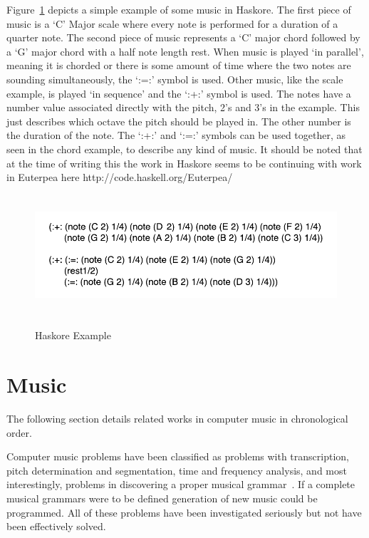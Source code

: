 \documentclass[12pt]{ucthesis}
\newcommand{\captionfonts}{\small\bf\ssp}
\begin{document}
Figure~\ref{fig:haskore-example} depicts a simple example of some music in Haskore. The first piece of music is a `C' Major scale where every note is performed for a duration of a quarter note. The second piece of music represents a `C' major chord followed by a `G' major chord with a half note length rest. When music is played `in parallel', meaning it is chorded or there is some amount of time where the two notes are sounding simultaneously, the `:=:' symbol is used. Other music, like the scale example, is played `in sequence' and the `:+:' symbol is used. The notes have a number value associated directly with the pitch, 2's and 3's in the example. This just describes which octave the pitch should be played in. The other number is the duration of the note. The `:+:' and `:=:' symbols can be used together, as seen in the chord example, to describe any kind of music. It should be noted that at the time of writing this the work in Haskore seems to be continuing with work in Euterpea here http://code.haskell.org/Euterpea/

\begin{figure}
\includegraphics[height=45mm]{haskore-example.pdf}
\captionfonts
\caption[Haskore Example]{Haskore Example}
\label{fig:haskore-example}
\end{figure}


\section{Music}
\label{rw:music}
The following section details related works in computer music in chronological order.

Computer music problems have been classified as problems with transcription, pitch determination and segmentation, time and frequency analysis, and most interestingly, problems in discovering a proper musical grammar~\cite{Gerhard}. If a complete musical grammars were to be defined generation of new music could be programmed. All of these problems have been investigated seriously but not have been effectively solved.
\end{document}
